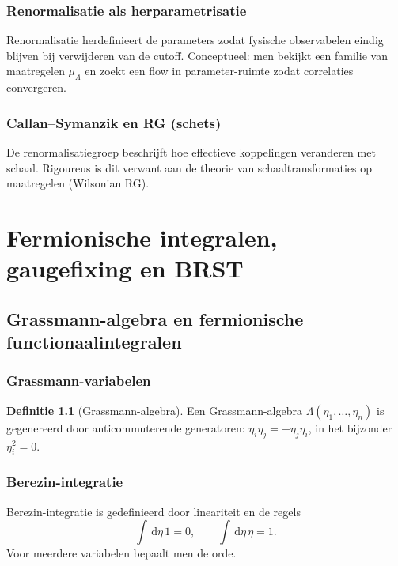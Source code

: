 \documentclass[11pt,a4paper,oneside]{book}
\theoremstyle{plain}
\theoremstyle{definition}
\newtheorem{definition}[theorem]{Definitie}
\renewcommand{\dd}{\,\mathrm{d}}
\begin{document}
	\section{Renormalisatie als herparametrisatie}
	Renormalisatie herdefinieert de parameters zodat fysische observabelen eindig blijven bij verwijderen van de cutoff.
	Conceptueel: men bekijkt een familie van maatregelen $\mu_\Lambda$ en zoekt een flow in parameter-ruimte zodat correlaties convergeren.
	
	\section{Callan--Symanzik en RG (schets)}
	De renormalisatiegroep beschrijft hoe effectieve koppelingen veranderen met schaal.
	Rigoureus is dit verwant aan de theorie van schaaltransformaties op maatregelen (Wilsonian RG).
	
	\part{Fermionische integralen, gaugefixing en BRST}
	
	\chapter{Grassmann-algebra en fermionische functionaalintegralen}
	
	\section{Grassmann-variabelen}
	\begin{definition}[Grassmann-algebra]
		Een Grassmann-algebra $\Lambda(\eta_1,\dots,\eta_n)$ is gegenereerd door anticommuterende generatoren:
		$\eta_i\eta_j=-\eta_j\eta_i$, in het bijzonder $\eta_i^2=0$.
	\end{definition}
	
	\section{Berezin-integratie}
	Berezin-integratie is gedefinieerd door lineariteit en de regels
	\[
	\int \dd \eta\, 1 = 0,\qquad \int \dd \eta\, \eta = 1.
	\]
	Voor meerdere variabelen bepaalt men de orde.
	
\end{document}
